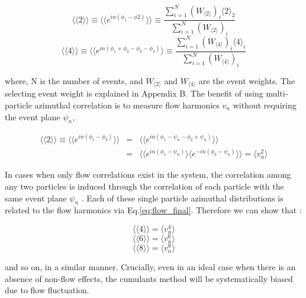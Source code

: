 \begin{equation}
	\langle \langle 2 \rangle \rangle \equiv \langle \langle e^{in(\phi_1 - \phi2)} \rangle \rangle \equiv \frac{\sum_{i=1}^{N}{(W_{\langle 2 \rangle})_i}\langle 2 \rangle_2 }{\sum_{i=1}^{N}{(W_{\langle 2 \rangle})_i}}
\end{equation}
\begin{equation}
	\langle \langle 4 \rangle \rangle \equiv \langle \langle e^{in(\phi_1 + \phi_2 - \phi_3 - \phi_4)} \rangle \equiv \frac{\sum_{i=1}^{N}{(W_{\langle 4 \rangle })_i}\langle 4 \rangle_i }{\sum_{i=1}^{N}{(W_{\langle 4 \rangle})_i}}
\end{equation}
\smallskip

where, N is the number of events, and $W_{\langle 2 \rangle}$ and $W_{\langle 4 \rangle}$ are the event weights. The selecting event weight is explained in Appendix B. The benefit of using multi-particle azimuthal correlation is to measure flow harmonics $v_n$ without requiring the event plane $\psi_n$, 

\begin{eqnarray}
	\langle \langle 2 \rangle \rangle \equiv \langle \langle e^{in(\phi_1 - \phi_2)} \rangle  \rangle &=& \langle \langle e^{in(\phi_1 - \psi_n - \phi_2 + \psi_n)} \rangle \rangle  \\
		&=& \langle \langle e^{in(\phi_1 - \psi_n)} \rangle \langle e^{-in(\phi_2-\psi_n)} \rangle \rangle = \langle v_n^2 \rangle
		\label{eq:vn2}
\end{eqnarray}

In cases when only flow correlations exist in the system, the correlation among any two particles is induced through the correlation of each particle with the same event plane $\psi_n$ \cite{Wang:1991qh, Tsang:1991zza}.
Each of these single particle azimuthal distributions is related to the flow harmonics via Eq.\ref{eq:flow_final}. Therefore we can show that :

\begin{equation}
	\langle \langle 4 \rangle \rangle = \langle v_n^4 \rangle 
\label{eq:vn4}
\end{equation}
\begin{equation}
	\langle \langle 6 \rangle \rangle = \langle v_n^6 \rangle 
\label{eq:vn6}
\end{equation}
\begin{equation}
	\langle \langle 8 \rangle \rangle = \langle v_n^8 \rangle
\label{eq:vn8}
\end{equation}


and so on, in a similar manner. Crucially, even in an ideal case when there is an absence of non-flow effects, the cumulants method will be systematically biased due to flow fluctuation. 


